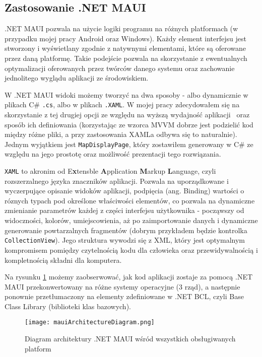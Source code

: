 \subsection{Zastosowanie .NET MAUI}

.NET MAUI pozwala na użycie logiki programu na różnych platformach 
(w przypadku mojej pracy Android oraz Windows).
Każdy element interfejsu jest stworzony i wyświetlany zgodnie z natywnymi elementami, 
które są oferowane przez daną platformę. Takie podejście pozwala na skorzystanie 
z ewentualnych optymalizacji oferowanych przez twórców danego systemu oraz 
zachowanie jednolitego wyglądu aplikacji ze środowiskiem.

W .NET MAUI widoki możemy tworzyć na dwa sposoby - albo dynamicznie w plikach C\# \verb|.cs|, 
albo w plikach \verb|.XAML|. W mojej pracy zdecydowałem się na skorzystanie z tej drugiej opcji 
ze względu na wyższą wydajność aplikacji~\cite{xamlPerformance} oraz sposób ich definiowania 
(korzystając ze wzorca MVVM dobrze jest podzielić kod między różne pliki, 
a przy zastosowania XAMLa odbywa się to naturalnie). Jednym wyjątkiem jest \verb|MapDisplayPage|, 
który zostawiłem generowany w C\# ze względu na jego prostotę oraz możliwość prezentacji tego rozwiązania.

\verb|XAML| to akronim od E\textbf{x}tensble \textbf{A}pplication \textbf{M}arkup \textbf{L}anguage, 
czyli rozszerzalnego języka znaczników aplikacji. Pozwala na uporządkowane i wyczerpujące opisanie 
widoków aplikacji, podpięcia (ang. Binding) wartości o róznych typach pod określone właściwości 
elementów, co pozwala na dynamiczne zmienianie parametrów każdej z części interfejsu użytkownika - 
począwszy od widoczności, kolorów, umiejscowienia, aż po zaimportowanie danych i dynamiczne generowanie 
powtarzalnych fragmentów (dobrym przykładem będzie kontrolka \verb|CollectionView|).
Jego struktura wywodzi się z XML, który jest optymalnym kompromisem pomiędzy czytelnością kodu dla człowieka 
oraz przewidywalnością i kompletnością składni dla komputera.

Na rysunku \ref{img:mauiArchitectureDiagram} możemy zaobserwować, jak kod aplikacji 
zostaje za pomocą .NET MAUI przekonwertowany na różne systemy operacyjne (3 rząd), 
a następnie ponownie przetłumaczony na elementy zdefiniowane w .NET BCL, 
czyli Base Class Library (biblioteki klas bazowych). \\
\begin{figure}[hb]
    \centering
    \texttt{[image: mauiArchitectureDiagram.png]}
    \caption{Diagram architektury .NET MAUI wśród wszystkich obsługiwanych platform~\cite{mauiDefinition}}
    \label{img:mauiArchitectureDiagram}
\end{figure}
